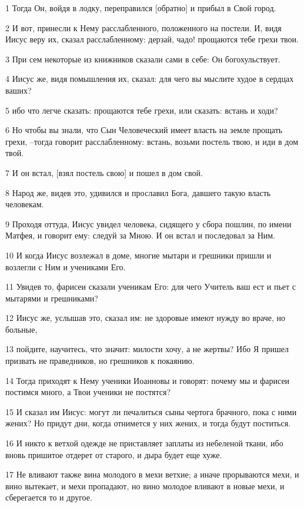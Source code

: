 \par 1 Тогда Он, войдя в лодку, переправился [обратно] и прибыл в Свой город.
\par 2 И вот, принесли к Нему расслабленного, положенного на постели. И, видя Иисус веру их, сказал расслабленному: дерзай, чадо! прощаются тебе грехи твои.
\par 3 При сем некоторые из книжников сказали сами в себе: Он богохульствует.
\par 4 Иисус же, видя помышления их, сказал: для чего вы мыслите худое в сердцах ваших?
\par 5 ибо что легче сказать: прощаются тебе грехи, или сказать: встань и ходи?
\par 6 Но чтобы вы знали, что Сын Человеческий имеет власть на земле прощать грехи, --тогда говорит расслабленному: встань, возьми постель твою, и иди в дом твой.
\par 7 И он встал, [взял постель свою] и пошел в дом свой.
\par 8 Народ же, видев это, удивился и прославил Бога, давшего такую власть человекам.
\par 9 Проходя оттуда, Иисус увидел человека, сидящего у сбора пошлин, по имени Матфея, и говорит ему: следуй за Мною. И он встал и последовал за Ним.
\par 10 И когда Иисус возлежал в доме, многие мытари и грешники пришли и возлегли с Ним и учениками Его.
\par 11 Увидев то, фарисеи сказали ученикам Его: для чего Учитель ваш ест и пьет с мытарями и грешниками?
\par 12 Иисус же, услышав это, сказал им: не здоровые имеют нужду во враче, но больные,
\par 13 пойдите, научитесь, что значит: милости хочу, а не жертвы? Ибо Я пришел призвать не праведников, но грешников к покаянию.
\par 14 Тогда приходят к Нему ученики Иоанновы и говорят: почему мы и фарисеи постимся много, а Твои ученики не постятся?
\par 15 И сказал им Иисус: могут ли печалиться сыны чертога брачного, пока с ними жених? Но придут дни, когда отнимется у них жених, и тогда будут поститься.
\par 16 И никто к ветхой одежде не приставляет заплаты из небеленой ткани, ибо вновь пришитое отдерет от старого, и дыра будет еще хуже.
\par 17 Не вливают также вина молодого в мехи ветхие; а иначе прорываются мехи, и вино вытекает, и мехи пропадают, но вино молодое вливают в новые мехи, и сберегается то и другое.
